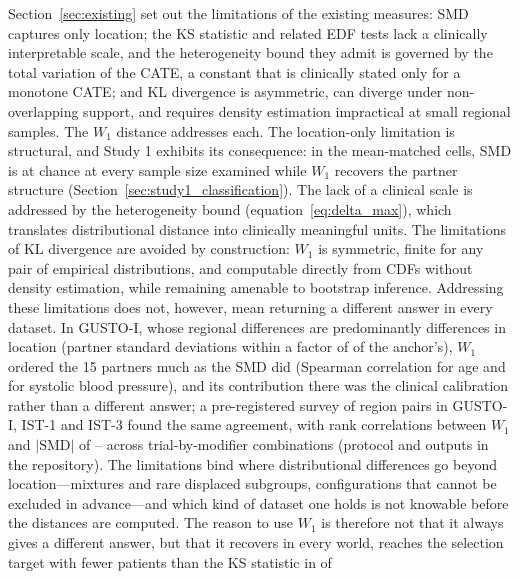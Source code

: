 \documentclass[AMA,Times1COL]{WileyNJDv5}
\begin{document}
Section~\ref{sec:existing} set out the limitations of the existing measures: SMD captures only location; the KS statistic and related EDF tests lack a clinically interpretable scale, and the heterogeneity bound they admit is governed by the total variation of the CATE, a constant that is clinically stated only for a monotone CATE; and KL divergence is asymmetric, can diverge under non-overlapping support, and requires density estimation impractical at small regional samples. The $W_1$ distance addresses each. The location-only limitation is structural, and Study 1 exhibits its consequence: in the mean-matched cells, SMD is at chance at every sample size examined while $W_1$ recovers the partner structure (Section~\ref{sec:study1_classification}). The lack of a clinical scale is addressed by the heterogeneity bound (equation~\ref{eq:delta_max}), which translates distributional distance into clinically meaningful units. The limitations of KL divergence are avoided by construction: $W_1$ is symmetric, finite for any pair of empirical distributions, and computable directly from CDFs without density estimation, while remaining amenable to bootstrap inference. Addressing these limitations does not, however, mean returning a different answer in every dataset. In GUSTO-I, whose regional differences are predominantly differences in location (partner standard deviations within a factor of  of the anchor's), $W_1$ ordered the 15 partners much as the SMD did (Spearman correlation  for age and  for systolic blood pressure), and its contribution there was the clinical calibration rather than a different answer; a pre-registered survey of  region pairs in GUSTO-I, IST-1 and IST-3 found the same agreement, with rank correlations between $W_1$ and $|\mathrm{SMD}|$ of -- across  trial-by-modifier combinations (protocol and outputs in the repository). The limitations bind where distributional differences go beyond location---mixtures and rare displaced subgroups, configurations that cannot be excluded in advance---and which kind of dataset one holds is not knowable before the distances are computed. The reason to use $W_1$ is therefore not that it always gives a different answer, but that it recovers in every world, reaches the selection target with fewer patients than the KS statistic in  of 
\end{document}
